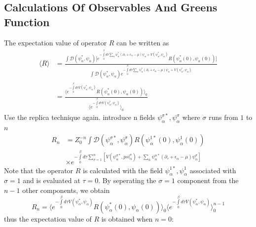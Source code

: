 \documentclass[12pt]{article}
\begin{document}
\subsection*{Calculations Of Observables And Greens Function}
The expectation value of operator $R$ can be written as
\begin{equation*}
    \begin{split}
        \langle R\rangle&=\frac{\int\mathcal{D}(\psi^*_\alpha,\psi_\alpha)
        \Big[e^{-\int\limits_0^\beta d\tau\sum_\alpha\psi^*_\alpha(\partial_\tau+
        \epsilon_\alpha-\mu)\psi_\alpha+V(\psi^*_\alpha,\psi_\alpha)}
        R(\psi^*_\alpha(0),\psi_\alpha(0))\Big]}{\int\mathcal{D}(\psi^*_\alpha,
        \psi_\alpha)e^{-\int\limits_0^\beta d\tau\sum_\alpha\psi^*_\alpha(\partial_\tau
        +\epsilon_\alpha-\mu)\psi_\alpha+V(\psi^*_\alpha,\psi_\alpha)}}\\
        &=\frac{\Big\langle e^{-\int\limits_0^\beta d\tau V(\psi^*_\alpha,
        \psi_\alpha)}R(\psi^*_\alpha(0),\psi_\alpha(0))\Big\rangle_0}
        {\Big\langle e^{-\int\limits_0^\beta d\tau V(\psi^*_\alpha,\psi_\alpha)}
        \Big\rangle_0}
    \end{split}
\end{equation*}
Use the replica technique again. introduce n fields ${\psi^{\sigma*}_\alpha,
\psi^\sigma_\alpha}$ where $\sigma$ runs from $1$ to $n$
\begin{equation*}
    \begin{split}
        R_n&=Z_0^{-n}\int\mathcal{D}(\psi^{\sigma*}_\alpha,\psi^\sigma_\alpha)
        R(\psi^{1*}_\alpha(0),\psi^1_\alpha(0))\\
        &\times e^{-\int\limits_0^\beta d\tau\sum_{\sigma=1}^n[
            V(\psi^{\sigma*}_\alpha,psi^\sigma_\alpha)+\sum_\alpha\psi^{\alpha*}
            _\alpha(\partial_\tau+\epsilon_\alpha-\mu)\psi^\sigma_\alpha]}
    \end{split}
\end{equation*}
Note that the operator $R$ is calculated with the field $\psi^{1*}_\alpha,
\psi^1_\alpha$ associated with $\sigma=1$ and is evaluated at $\tau=0$. By 
seperating the $\sigma=1$ component from the $n-1$ other components, we obtain
\begin{equation*}
    R_n=\Big\langle e^{-\int\limits_0^\beta d\tau V(\psi^*_\alpha,\psi_\alpha)}
    R(\psi^*_\alpha(0),\psi_\alpha(0))\Big\rangle_0\Big\langle e^{-\int\limits_0
    ^\beta d\tau V(\psi^*_\alpha,\psi_\alpha)}\Big\rangle_0^{n-1}
\end{equation*}
thus the expectation value of $R$ is obtained when $n=0$:
\end{document}
